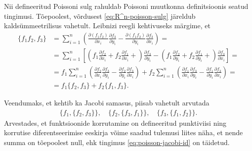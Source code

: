 Nii defineeritud Poissoni sulg rahuldab Poissoni muutkonna definitsioonis
seatud tingimusi. Tõepoolest, võrdusest \eqref{eq:R^n-poisson-sulg}
järeldub kaldsümmeetrilisus vahetult. Leibnizi reegli kehtivuseks
märgime, et
\begin{align*}
    \{f_1 f_2, f_3\} &= \sum_{i=1}^{n} \left(
        \frac{\partial (f_1 f_2)}{\partial x_i}
        \frac{\partial f_3}{\partial y_i} -
        \frac{\partial (f_1 f_2)}{\partial y_i}
        \frac{\partial f_3}{\partial x_i}
    \right) = \\
    &= \sum_{i=1}^{n} \left[
        \left(
            f_1 \frac{\partial f_2}{\partial x_i} +
            f_2 \frac{\partial f_1}{\partial x_i} +
        \right) \frac{\partial f_3}{\partial y_i} -
        \left(
            f_1 \frac{\partial f_2}{\partial y_i} +
            f_2 \frac{\partial f_1}{\partial y_i} +
        \right) \frac{\partial f_3}{\partial x_i}
    \right] = \\
    &= f_1 \sum_{i=1}^{n} \left(
            \frac{\partial f_2}{\partial x_i}
            \frac{\partial f_3}{\partial y_i} -
            \frac{\partial f_2}{\partial y_i}
            \frac{\partial f_3}{\partial x_i}
        \right) +
        f_2 \sum_{i=1}^{n} \left(
                \frac{\partial f_1}{\partial x_i}
                \frac{\partial f_3}{\partial y_i} -
                \frac{\partial f_1}{\partial y_i}
                \frac{\partial f_3}{\partial x_i}
        \right) = \\
    &= f_1 \{f_2, f_3\} + f_2 \{f_1, f_3\}.
\end{align*}

Veendumaks, et kehtib ka Jacobi samasus, piisab vahetult arvutada
\begin{align*}
    \{f_1, \{f_2, f_3\}\}, \quad
    \{f_2, \{f_3, f_1\}\}, \quad
    \{f_3, \{f_1, f_2\}\}.
\end{align*}
Arvestades, et funktsioonide korrutamine on defineeritud punktiviisi ning
korrutise diferentseerimise eeskirja võime saadud tulemusi liites näha, et
nende summa on tõepoolest null, ehk tingimus \eqref{eq:poisson-jacobi-id}
on täidetud.

